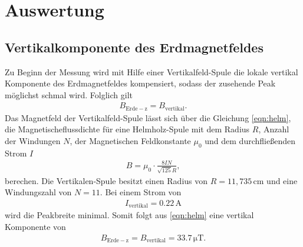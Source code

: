 \section{Auswertung}
\label{sec:Auswertung}
\subsection{Vertikalkomponente des Erdmagnetfeldes}
Zu Beginn der Messung wird mit Hilfe einer Vertikalfeld-Spule
die lokale vertikal Komponente des Erdmagnetfeldes kompensiert, sodass
der zusehende Peak
möglichst schmal wird. Folglich
gilt
\begin{align*}
B_\mathrm{Erde-z}=B_\mathrm{vertikal}.
\end{align*}
Das Magnetfeld der Vertikalfeld-Spule lässt sich über die Gleichung
\eqref{eqn:helm}, die Magnetischeflussdichte für eine Helmholz-Spule mit dem Radius $R$,
Anzahl der Windungen $N$, der Magnetischen Feldkonstante $\mu_0$ und dem durchfließenden Strom $I$
\begin{align}
B=\mu_0 \cdot \frac{8 I N}{\sqrt{125} R}, \label{eqn:helm}
\end{align}
berechen. Die Vertikalen-Spule besitzt einen Radius von $R=11,735\,\si{\centi\meter} $
und eine Windungszahl von $N=11$.
Bei einem Strom von
\begin{align*}
  I_\mathrm{vertikal}=0.22 \,\si{\ampere}
\end{align*}
wird die Peakbreite minimal. Somit folgt aus \eqref{eqn:helm}
eine  vertikal Komponente von
\begin{align*}
  B_\mathrm{Erde-z}=B_\mathrm{vertikal}=33.7\,\si{\micro\tesla}.
\end{align*}


\newpage
